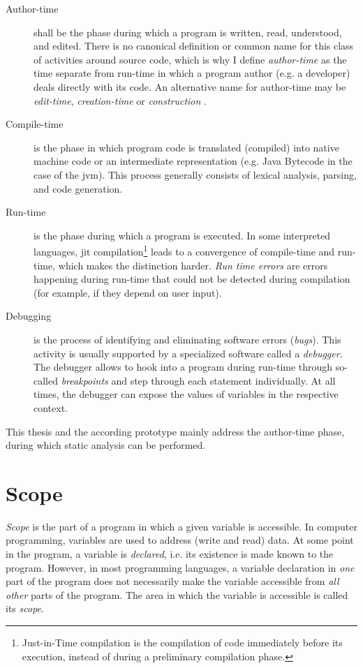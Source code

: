 \begin{description}
\item[Author-time]
shall be the phase during which a program is written, read, understood,
and edited. There is no canonical definition or common name for this
class of activities around source code, which is why I define
\emph{author-time} as the time separate from run-time in which a program
author (e.g. a developer) deals directly with its code. An alternative
name for author-time may be \emph{edit-time}, \emph{creation-time}
\cite{getify} or \emph{construction} \cite{mcconnell}.
\item[Compile-time]
is the phase in which program code is translated (compiled) into native
machine code or an intermediate representation (e.g. Java Bytecode in
the case of the \ac{jvm}). This process generally consists of lexical
analysis, parsing, and code generation.
\item[Run-time]
is the phase during which a program is executed. In some interpreted
languages, \ac{jit} compilation\footnote{Just-in-Time compilation is the
  compilation of code immediately before its execution, instead of
  during a preliminary compilation phase.} leads to a convergence of
compile-time and run-time, which makes the distinction harder. \emph{Run
time errors} are errors happening during run-time that could not be
detected during compilation (for example, if they depend on user input).
\item[Debugging]
is the process of identifying and eliminating software errors
(\emph{bugs}). This activity is usually supported by a specialized
software called a \emph{debugger}. The debugger allows to hook into a
program during run-time through so-called \emph{breakpoints} and step
through each statement individually. At all times, the debugger can
expose the values of variables in the respective context.
\end{description}

This thesis and the according prototype mainly address the author-time
phase, during which static analysis can be performed.

\section{Scope}\label{scope}

\emph{Scope} is the part of a program in which a given variable is
accessible. In computer programming, variables are used to address
(write and read) data. At some point in the program, a variable is
\emph{declared}, i.e. its existence is made known to the program.
However, in most programming languages, a variable declaration in
\emph{one} part of the program does not necessarily make the variable
accessible from \emph{all other} parts of the program. The area in which
the variable is accessible is called its \emph{scope}.

